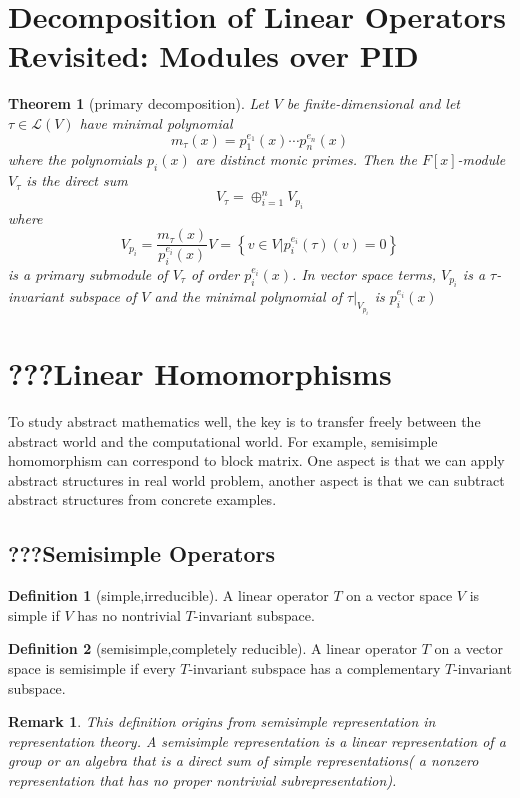 \documentclass{book}
\newtheorem{theorem}{Theorem}[section]
\newtheorem*{remark}{Remark}
\theoremstyle{definition}
\newtheorem{definition}{Definition}[section]
\begin{document}
\section{Decomposition of Linear Operators Revisited: Modules over PID}
\begin{theorem}[primary decomposition]
Let $V$ be finite-dimensional and let $\tau\in\mathcal{L}(V)$  have minimal polynomial  \[m_{\tau}(x)=p_1^{e_1}(x)\cdots p_n^{e_n}(x)\]where the polynomials $p_i(x)$ are distinct monic primes. Then the $F[x]$-module $V_{\tau}$ is the direct sum \[V_{\tau}=\oplus_{i=1}^{n}V_{p_i}\]where \[V_{p_i}=\frac{m_{\tau}(x)}{p_i^{e_i}(x)}V=\left\{v\in V|p_i^{e_i}(\tau)(v)=0\right\}\]is a primary submodule of $V_\tau$ of order $p_i^{e_i}(x)$. In vector space terms, $V_{p_i}$ is a $\tau$-invariant subspace of $V$ and the minimal polynomial of $\tau|_{V_{p_i}}$ is $p_i^{e_i}(x)$
\end{theorem}




\section{???Linear Homomorphisms}
To study abstract mathematics well, the key is to transfer freely between the abstract world and the computational world. For example, semisimple homomorphism can correspond to block matrix. One aspect is that we can apply abstract structures in real world problem, another aspect is that we can subtract abstract structures from concrete examples.

\subsection{???Semisimple Operators}
\begin{definition}[simple,irreducible]
A linear operator $T$ on a vector space $V$ is simple if  $V$ has no nontrivial $T$-invariant subspace.
\end{definition}
\begin{definition}[semisimple,completely reducible]
A linear operator $T$ on a vector space is semisimple if every $T$-invariant subspace has a complementary $T$-invariant subspace.
\end{definition}
\begin{remark}
This definition origins from semisimple representation in representation theory.
A semisimple representation is a linear representation of a group or an algebra that is a direct sum of simple representations( a nonzero representation that has no proper nontrivial subrepresentation).
\end{remark}
\end{document}
